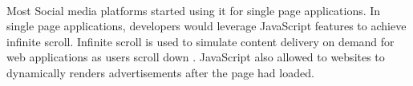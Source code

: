 \paragraph{}
Most Social media platforms started using it for single page applications. In single page applications, developers would leverage JavaScript features to achieve infinite scroll. Infinite scroll is used to simulate content delivery on demand for web applications as users scroll down \cite{ctx2425553500004041}. JavaScript also allowed to websites to dynamically renders advertisements after the page had loaded.
\paragraph{}


